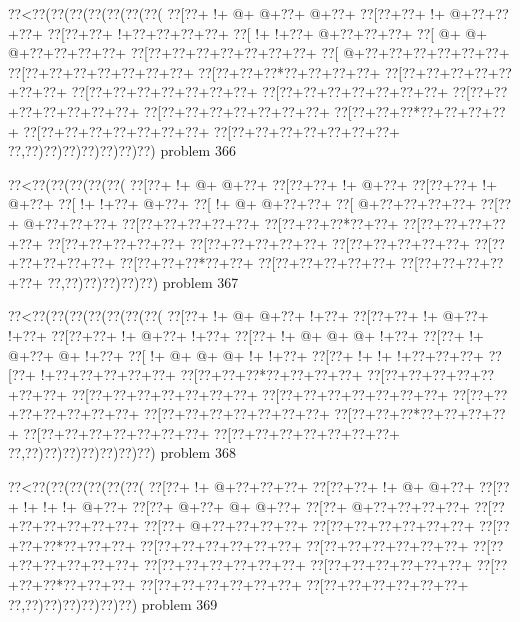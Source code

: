 \vbox{\vbox{\goo
\0??<\0??(\0??(\0??(\0??(\0??(\0??(\0??(
\0??[\0??+\- !+\- @+\- @+\0??+\- @+\0??+
\0??[\0??+\0??+\- !+\- @+\0??+\0??+\0??+
\0??[\0??+\0??+\- !+\0??+\0??+\0??+\0??+
\0??[\- !+\- !+\0??+\- @+\0??+\0??+\0??+
\0??[\- @+\- @+\- @+\0??+\0??+\0??+\0??+
\0??[\0??+\0??+\0??+\0??+\0??+\0??+\0??+
\0??[\- @+\0??+\0??+\0??+\0??+\0??+\0??+
\0??[\0??+\0??+\0??+\0??+\0??+\0??+\0??+
\0??[\0??+\0??+\0??*\0??+\0??+\0??+\0??+
\0??[\0??+\0??+\0??+\0??+\0??+\0??+\0??+
\0??[\0??+\0??+\0??+\0??+\0??+\0??+\0??+
\0??[\0??+\0??+\0??+\0??+\0??+\0??+\0??+
\0??[\0??+\0??+\0??+\0??+\0??+\0??+\0??+
\0??[\0??+\0??+\0??+\0??+\0??+\0??+\0??+
\0??[\0??+\0??+\0??*\0??+\0??+\0??+\0??+
\0??[\0??+\0??+\0??+\0??+\0??+\0??+\0??+
\0??[\0??+\0??+\0??+\0??+\0??+\0??+\0??+
\0??,\0??)\0??)\0??)\0??)\0??)\0??)\0??)
}
\hfil problem 366\hfil\break
}

\vbox{\vbox{\goo
\0??<\0??(\0??(\0??(\0??(\0??(
\0??[\0??+\- !+\- @+\- @+\0??+
\0??[\0??+\0??+\- !+\- @+\0??+
\0??[\0??+\0??+\- !+\- @+\0??+
\0??[\- !+\- !+\0??+\- @+\0??+
\0??[\- !+\- @+\- @+\0??+\0??+
\0??[\- @+\0??+\0??+\0??+\0??+
\0??[\0??+\- @+\0??+\0??+\0??+
\0??[\0??+\0??+\0??+\0??+\0??+
\0??[\0??+\0??+\0??*\0??+\0??+
\0??[\0??+\0??+\0??+\0??+\0??+
\0??[\0??+\0??+\0??+\0??+\0??+
\0??[\0??+\0??+\0??+\0??+\0??+
\0??[\0??+\0??+\0??+\0??+\0??+
\0??[\0??+\0??+\0??+\0??+\0??+
\0??[\0??+\0??+\0??*\0??+\0??+
\0??[\0??+\0??+\0??+\0??+\0??+
\0??[\0??+\0??+\0??+\0??+\0??+
\0??,\0??)\0??)\0??)\0??)\0??)
}
\hfil problem 367\hfil\break
}

\vbox{\vbox{\goo
\0??<\0??(\0??(\0??(\0??(\0??(\0??(\0??(
\0??[\0??+\- !+\- @+\- @+\0??+\- !+\0??+
\0??[\0??+\0??+\- !+\- @+\0??+\- !+\0??+
\0??[\0??+\0??+\- !+\- @+\0??+\- !+\0??+
\0??[\0??+\- !+\- @+\- @+\- @+\- !+\0??+
\0??[\0??+\- !+\- @+\0??+\- @+\- !+\0??+
\0??[\- !+\- @+\- @+\- @+\- !+\- !+\0??+
\0??[\0??+\- !+\- !+\- !+\0??+\0??+\0??+
\0??[\0??+\- !+\0??+\0??+\0??+\0??+\0??+
\0??[\0??+\0??+\0??*\0??+\0??+\0??+\0??+
\0??[\0??+\0??+\0??+\0??+\0??+\0??+\0??+
\0??[\0??+\0??+\0??+\0??+\0??+\0??+\0??+
\0??[\0??+\0??+\0??+\0??+\0??+\0??+\0??+
\0??[\0??+\0??+\0??+\0??+\0??+\0??+\0??+
\0??[\0??+\0??+\0??+\0??+\0??+\0??+\0??+
\0??[\0??+\0??+\0??*\0??+\0??+\0??+\0??+
\0??[\0??+\0??+\0??+\0??+\0??+\0??+\0??+
\0??[\0??+\0??+\0??+\0??+\0??+\0??+\0??+
\0??,\0??)\0??)\0??)\0??)\0??)\0??)\0??)
}
\hfil problem 368\hfil\break
}

\vbox{\vbox{\goo
\0??<\0??(\0??(\0??(\0??(\0??(\0??(
\0??[\0??+\- !+\- @+\0??+\0??+\0??+
\0??[\0??+\0??+\- !+\- @+\- @+\0??+
\0??[\0??+\- !+\- !+\- !+\- @+\0??+
\0??[\0??+\- @+\0??+\- @+\- @+\0??+
\0??[\0??+\- @+\0??+\0??+\0??+\0??+
\0??[\0??+\0??+\0??+\0??+\0??+\0??+
\0??[\0??+\- @+\0??+\0??+\0??+\0??+
\0??[\0??+\0??+\0??+\0??+\0??+\0??+
\0??[\0??+\0??+\0??*\0??+\0??+\0??+
\0??[\0??+\0??+\0??+\0??+\0??+\0??+
\0??[\0??+\0??+\0??+\0??+\0??+\0??+
\0??[\0??+\0??+\0??+\0??+\0??+\0??+
\0??[\0??+\0??+\0??+\0??+\0??+\0??+
\0??[\0??+\0??+\0??+\0??+\0??+\0??+
\0??[\0??+\0??+\0??*\0??+\0??+\0??+
\0??[\0??+\0??+\0??+\0??+\0??+\0??+
\0??[\0??+\0??+\0??+\0??+\0??+\0??+
\0??,\0??)\0??)\0??)\0??)\0??)\0??)
}
\hfil problem 369\hfil\break
}

